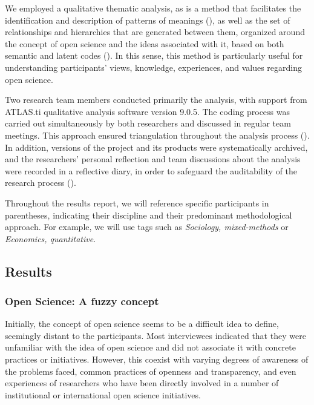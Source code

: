 \documentclass[
  english,
  letterpaper,
]{article}
\begin{document}
We employed a qualitative thematic analysis, as is a method that
facilitates the identification and description of patterns of meanings
(), as well as the
set of relationships and hierarchies that are generated between them,
organized around the concept of open science and the ideas associated
with it, based on both semantic and latent codes
(). In this
sense, this method is particularly useful for understanding
participants' views, knowledge, experiences, and values regarding open
science.

Two research team members conducted primarily the analysis, with support
from ATLAS.ti qualitative analysis software version 9.0.5. The coding
process was carried out simultaneously by both researchers and discussed
in regular team meetings. This approach ensured triangulation throughout
the analysis process (). In addition, versions of the project and its products were
systematically archived, and the researchers' personal reflection and
team discussions about the analysis were recorded in a reflective diary,
in order to safeguard the auditability of the research process
().

Throughout the results report, we will reference specific participants
in parentheses, indicating their discipline and their predominant
methodological approach. For example, we will use tags such as
\emph{Sociology, mixed-methods} or \emph{Economics, quantitative}.

\subsection{Results}\label{results}

\subsubsection{\texorpdfstring{\textbf{Open Science: A fuzzy
concept}}{Open Science: A fuzzy concept}}\label{open-science-a-fuzzy-concept}

Initially, the concept of open science seems to be a difficult idea to
define, seemingly distant to the participants. Most interviewees
indicated that they were unfamiliar with the idea of open science and
did not associate it with concrete practices or initiatives. However,
this coexist with varying degrees of awareness of the problems faced,
common practices of openness and transparency, and even experiences of
researchers who have been directly involved in a number of institutional
or international open science initiatives.
\end{document}
